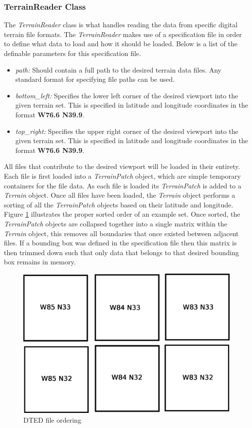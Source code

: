 \subsubsection{TerrainReader Class}
The \textit{TerrainReader} class is what handles reading the data from specific digital terrain file formats.  The \textit{TerrainReader} makes use of a specification file in order to define what data to load and how it should be loaded.  Below is a list of the definable parameters for this specification file.

\begin{itemize}
\item \textit{path: } Should contain a full path to the desired terrain data files.  Any standard format for specifying file paths can be used.
\item \textit{bottom\_left: } Specifies the lower left corner of the desired viewport into the given terrain set.  This is specified in latitude and longitude coordinates in the format \textbf{W76.6 N39.9}.
\item  \textit{top\_right: } Specifies the upper right corner of the desired viewport into the given terrain set.  This is specified in latitude and longitude coordinates in the format \textbf{W76.6 N39.9}.
\end{itemize}

All files that contribute to the desired viewport will be loaded in their entirety.  Each file is first loaded into a \textit{TerrainPatch} object, which are simple temporary containers for the file data.  As each file is loaded its \textit{TerrainPatch} is added to a \textit{Terrain} object.  Once all files have been loaded, the \textit{Terrain} object performs a sorting of all the \textit{TerrainPatch} objects based on their latitude and longitude.  Figure \ref{fig:dted_layout} illustrates the proper sorted order of an example set.  Once sorted, the \textit{TerrainPatch} objects are collapsed together into a single matrix within the \textit{Terrain} object, this removes all boundaries that once existed between adjacent files.  If a bounding box was defined in the specification file then this matrix is then trimmed down such that only data that belongs to that desired bounding box remains in memory.

\begin{figure}[ht]
\centering
  \includegraphics[width=0.5\linewidth]{images/network_vis/dted_file_layout.eps}
  \caption{DTED file ordering}
\label{fig:dted_layout}
\end{figure}


